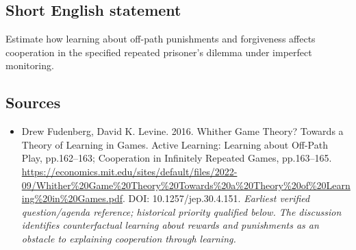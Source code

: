 \documentclass[11pt]{article}
\begin{document}
\subsection{Short English statement}
Estimate how learning about off-path punishments and forgiveness affects cooperation in the specified repeated prisoner’s dilemma under imperfect monitoring.

\subsection{Sources}
\begin{itemize}\raggedright
\item[\textnormal{[S1]}]\hypertarget{source:30007564:1}{} Drew Fudenberg, David K. Levine. 2016. Whither Game Theory? Towards a Theory of Learning in Games. Active Learning: Learning about Off-Path Play, pp.162–163; Cooperation in Infinitely Repeated Games, pp.163–165.
\url{https://economics.mit.edu/sites/default/files/2022-09/Whither%20Game%20Theory%20Towards%20a%20Theory%20of%20Learning%20in%20Games.pdf}.
DOI: 10.1257/jep.30.4.151.
{\small\textit{Earliest verified question/agenda reference; historical priority qualified below. The discussion identifies counterfactual learning about rewards and punishments as an obstacle to explaining cooperation through learning.}}
\end{itemize}
\end{document}
